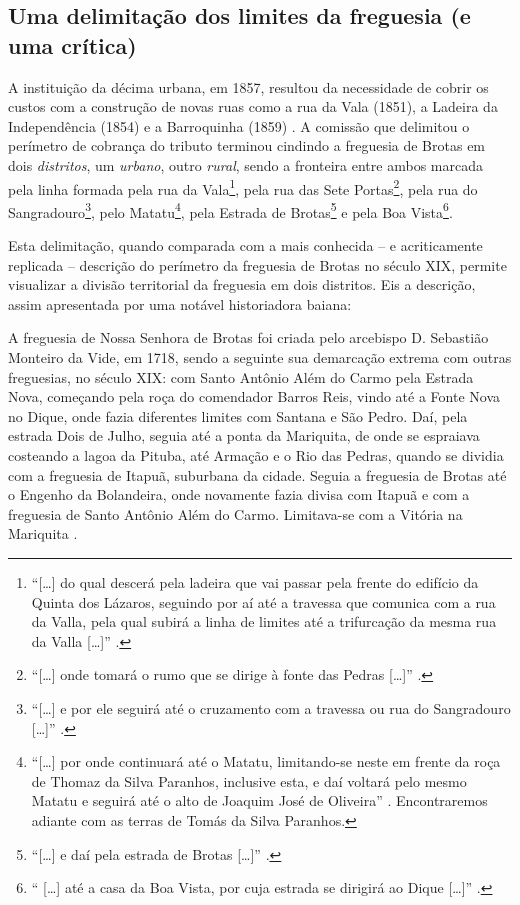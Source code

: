 \subsection{Uma delimitação dos limites da freguesia (e uma crítica)}

A instituição da décima urbana, em 1857, resultou da necessidade de cobrir os custos com a construção de novas ruas como a rua da Vala (1851), a Ladeira da Independência (1854) e a Barroquinha (1859) \cite[p.~309]{ruy_camara_1953}. A comissão que delimitou o perímetro de cobrança do tributo terminou cindindo a freguesia de Brotas em dois \textit{distritos}, um \textit{urbano}, outro \textit{rural}, sendo a fronteira entre ambos marcada pela linha formada pela rua da Vala\footnote{``[\dots] do qual descerá pela ladeira que vai passar pela frente do edifício da Quinta dos Lázaros, seguindo por aí até a travessa que comunica com a rua da Valla, pela qual subirá a linha de limites até a trifurcação da mesma rua da Valla [\dots]'' \cite[pp.~309-310]{ruy_camara_1953}.}, pela rua das Sete Portas\footnote{``[\dots] onde tomará o rumo que se dirige à fonte das Pedras [\dots]'' \cite[pp.~309-310]{ruy_camara_1953}.}, pela rua do Sangradouro\footnote{``[\dots] e por ele seguirá até o cruzamento com a travessa ou rua do Sangradouro [\dots]'' \cite[p.~310]{ruy_camara_1953}.}, pelo Matatu\footnote{``[\dots] por onde continuará até o Matatu, limitando-se neste em frente da roça de Thomaz da Silva Paranhos, inclusive esta, e daí voltará pelo mesmo Matatu e seguirá até o alto de Joaquim José de Oliveira'' \cite[p.~310]{ruy_camara_1953}. Encontraremos adiante com as terras de Tomás da Silva Paranhos.}, pela Estrada de Brotas\footnote{``[\dots] e daí pela estrada de Brotas [\dots]'' \cite[p.~310]{ruy_camara_1953}.} e pela Boa Vista\footnote{`` [\dots] até a casa da Boa Vista, por cuja estrada se dirigirá ao Dique [\dots]'' \cite[p.~310]{ruy_camara_1953}.}. 

Esta delimitação, quando comparada com a mais conhecida -- e acriticamente replicada -- descrição do perímetro da freguesia de Brotas no século XIX, permite visualizar a divisão territorial da freguesia em dois distritos. Eis a descrição, assim apresentada por uma notável historiadora baiana:

\begin{citacao}
A freguesia de Nossa Senhora de Brotas foi criada pelo arcebispo D. Sebastião Monteiro da Vide, em 1718, sendo a seguinte sua demarcação extrema com outras freguesias, no século XIX: com Santo Antônio Além do Carmo pela Estrada Nova, começando pela roça do comendador Barros Reis, vindo até a Fonte Nova no Dique, onde fazia diferentes limites com Santana e São Pedro. Daí, pela estrada Dois de Julho, seguia até a ponta da Mariquita, de onde se espraiava costeando a lagoa da Pituba, até Armação e o Rio das Pedras, quando se dividia com a freguesia de Itapuã, suburbana da cidade. Seguia a freguesia de Brotas até o Engenho da Bolandeira, onde novamente fazia divisa com Itapuã e com a freguesia de Santo Antônio Além do Carmo. Limitava-se com a Vitória na Mariquita \cite[p.~58]{NASCIMENTO2007}.
\end{citacao}

